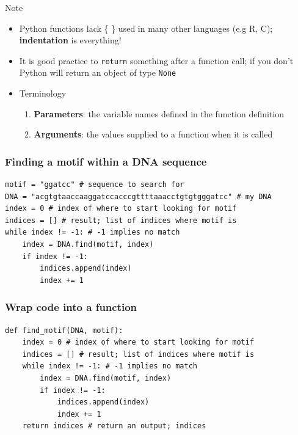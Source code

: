 \documentclass[xcolor=table]{beamer}
\begin{document}
\begin{frame}{Note}

\begin{itemize}\addtolength{\itemsep}{1.5\baselineskip}

\item<1-> Python functions lack \{ \} used in many other languages (e.g R, C); \textbf{indentation} is everything!

\item<2-> It is good practice to \texttt{return} something after a function call; if you don't
Python will return an object of type \texttt{None}

\item<3-> Terminology
\begin{enumerate}\addtolength{\itemsep}{.5\baselineskip}
	\item \textbf{Parameters}: the variable names defined in the function definition
	\item \textbf{Arguments}: the values supplied to a function when it is called 
\end{enumerate}
\end{itemize}

\end{frame}



\begin{frame}[fragile]
\frametitle{Finding a motif within a DNA sequence}

\begin{lstlisting}[style=python]
motif = "ggatcc" # sequence to search for
DNA = "acgtgtaaccaaggatccacccgttttaaacctgtgtgggatcc" # my DNA
index = 0 # index of where to start looking for motif
indices = [] # result; list of indices where motif is
while index != -1: # -1 implies no match
    index = DNA.find(motif, index)
    if index != -1:
        indices.append(index)
        index += 1
\end{lstlisting}

\end{frame}

\begin{frame}[fragile]
\frametitle{Wrap code into a function}

\begin{lstlisting}[style=python]
def find_motif(DNA, motif):
    index = 0 # index of where to start looking for motif
    indices = [] # result; list of indices where motif is
    while index != -1: # -1 implies no match
        index = DNA.find(motif, index)
        if index != -1:
            indices.append(index)
            index += 1
    return indices # return an output; indices
\end{lstlisting}

\end{frame}
\end{document}
